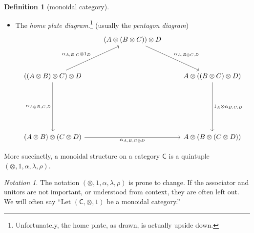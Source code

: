 \documentclass[a4paper,10pt]{scrreprt}
\theoremstyle{definition}
\newtheorem{definition}{Definition}[section]
\theoremstyle{plain}
\theoremstyle{remark}
\newtheorem{notation}{Notation}[section]
\begin{document}
\begin{definition}[monoidal category]
\begin{itemize}
    \item The \emph{home plate diagram}.\footnote{Unfortunately, the home plate, as drawn, is actually upside down.} (usually the \emph{pentagon diagram})
      \begin{equation*}
        \begin{tikzcd}[row sep=huge]
          & (A \otimes (B \otimes C)) \otimes D 
          \arrow[dr, "\alpha_{A,B\otimes C, D}"] 
          \\
          ((A \otimes B) \otimes C) \otimes D 
          \arrow[ur, "\alpha_{A,B,C}\otimes 1_{D}"] 
          \arrow[dd, swap, "\alpha_{A\otimes B, C,D}"]
          & & A \otimes ((B \otimes C) \otimes D) 
          \arrow[dd, "1_{A}\otimes\alpha_{B,C,D}"]  
          \\
          \\
          (A \otimes B) \otimes (C \otimes D) 
          \arrow[rr, swap, "\alpha_{A,B,C\otimes D}"] 
          & & A \otimes(B \otimes (C \otimes D))
        \end{tikzcd}
      \end{equation*}
  \end{itemize}

  More succinctly, a monoidal structure on a category $\mathsf{C}$ is a quintuple $(\otimes, 1, \alpha, \lambda, \rho)$. 
\end{definition}

\begin{notation}
  The notation $(\otimes, 1, \alpha, \lambda, \rho)$ is prone to change. If the associator and unitors are not important, or understood from context, they are often left out. We will often say ``Let $(\mathsf{C}, \otimes, 1)$ be a monoidal category.''
\end{notation}
\end{document}
